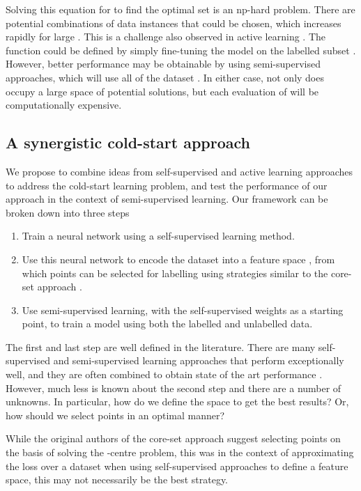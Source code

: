 \documentclass{article}
\begin{document}
Solving this equation for  to find the optimal set  is an np-hard problem. There are  potential combinations of data instances that could be chosen, which increases rapidly for large . This is a challenge also observed in active learning \citep{houlsby2011bayesian}. The function  could be defined by simply fine-tuning the model on the labelled subset . However, better performance may be obtainable by using semi-supervised approaches, which will use all of the dataset . In either case, not only does  occupy a large space of potential solutions, but each evaluation of  will be computationally expensive. 

\subsection{A synergistic cold-start approach}

We propose to combine ideas from self-supervised and active learning approaches to address the cold-start learning problem, and test the performance of our approach in the context of semi-supervised learning. Our framework can be broken down into three steps

\begin{enumerate}
    \item Train a neural network using a self-supervised learning method.
    \item Use this neural network to encode the dataset into a feature space , from which points can be selected for labelling using strategies similar to the core-set approach \citep{sener2017active}.
    \item Use semi-supervised learning, with the self-supervised weights as a starting point, to train a model using both the labelled and unlabelled data.
\end{enumerate}

The first and last step are well defined in the literature. There are many self-supervised and semi-supervised learning approaches that perform exceptionally well, and they are often combined to obtain state of the art performance \citep{cai2022semi}. However, much less is known about the second step and there are a number of unknowns. In particular, how do we define the space  to get the best results? Or, how should we select points in an optimal manner?

While the original authors of the core-set approach suggest selecting points on the basis of solving the -centre problem, this was in the context of approximating the loss over a dataset \textemdash{} when using self-supervised approaches to define a feature space, this may not necessarily be the best strategy.
\end{document}
